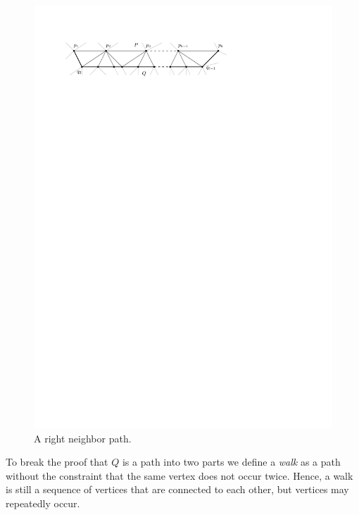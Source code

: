     \begin{figure}[t]
      \centering
      \includegraphics[scale=1]{unifiedAlgo/img/rightNeighbourwalk/neighborPath.pdf}
      \caption{A right neighbor path.}
      \label{fig:right:neighborPath}
    \end{figure}

    To break the proof that $Q$ is a path into two parts we define a \emph{walk} as a path without the constraint that the same vertex does not occur twice. Hence, a walk is still a sequence of vertices that are connected to each other, but vertices may repeatedly occur.

